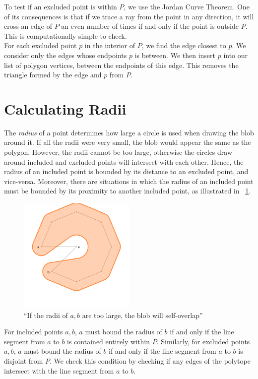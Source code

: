 \documentclass[paper=a4, fontsize=11pt]{scrartcl} %
\numberwithin{equation}{section} %
\numberwithin{figure}{section} %
\numberwithin{table}{section} %
\begin{document}
To test if an excluded point is within $P$, we use the Jordan Curve Theorem. One
of its consequences is that if we trace a ray from the point in any direction,
it will cross an edge of $P$ an even number of times if and only if the point is
outside $P$.  This is computationally simple to check. \\

For each excluded point $p$ in the interior of $P$, we find the edge closest to
$p$. We consider only the edges whose endpoints $p$ is between.  We then insert
$p$ into our list of polygon vertices, between the endpoints of this edge. This
removes the triangle formed by the edge and $p$ from $P$.


\section{Calculating Radii}
The \textit{radius} of a point determines how large a circle is used when
drawing the blob around it. If all the radii were very small, the blob would
appear the same as the polygon.  However, the radii cannot be too large,
otherwise the circles draw around included and excluded points will intersect
with each other. Hence, the radius of an included point is bounded by its
distance to an excluded point, and vice-versa. Moreover, there are situations in
which the radius of an included point must be bounded by its proximity to
another included point, as illustrated in ~\ref{fig:neck}.

\begin{figure}[h]
\includegraphics[width=0.5\textwidth]{torus_bitten}
\centering
\caption{``If the radii of $a,b$ are too large, the blob will self-overlap''}
\label{fig:neck}
\end{figure}

For included points $a,b$, $a$ must bound the radius of $b$ if and only if the
line segment from $a$ to $b$ is contained entirely within $P$. Similarly, for
excluded points $a,b$, $a$ must bound the radius of $b$ if and only if the line
segment from $a$ to $b$ is disjoint from $P$. We check this condition by
checking if any edges of the polytope intersect with the line segment from $a$
to $b$. \\
\end{document}
